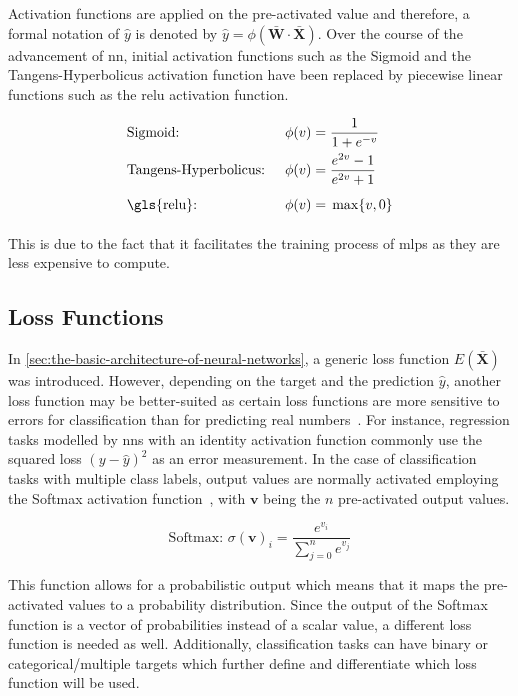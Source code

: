 \documentclass[draft,final]{vutinfth} %
\newcommand{\p}[1]{see p. #1}
\begin{document}
    \footnotetext{\cite[\p{13}]{aggarwal_neural_2018}}

    Activation functions are applied on the pre-activated value and therefore, a formal notation of $\hat{y}$ is denoted by $\hat{y}=\phi(\bar{\boldsymbol{W}}\cdot\bar{\boldsymbol{X}})$.
    Over the course of the advancement of \gls{nn}, initial activation functions such as the Sigmoid and the Tangens-Hyperbolicus activation function have been replaced by piecewise linear functions such as the \gls{relu} activation function.

    \begin{align*}
        &\text{Sigmoid: } &  \phi(v) & = \frac{1}{1+e^{-v}} \\
        &\text{Tangens-Hyperbolicus: } &  \phi(v) &= \frac{e^{2v}-1}{e^{2v}+1} \\
        &\text{\gls{relu}: } &  \phi(v)& = \vphantom{\frac11} \max\{v,0\}
    \end{align*}

    This is due to the fact that it facilitates the training process of \glspl{mlp} as they are less expensive to compute.

    \subsection{Loss Functions}\label{subsec:loss-functions}
    In \autoref{sec:the-basic-architecture-of-neural-networks}, a generic loss function $E(\bar{\boldsymbol{X}})$ was introduced.
    However, depending on the target and the prediction $\hat{y}$, another loss function may be better-suited as certain loss functions are more sensitive to errors for classification than for predicting real numbers~\citep[\p{15}]{aggarwal_neural_2018}.
    For instance, regression tasks modelled by \glspl{nn} with an identity activation function commonly use the squared loss $(y - \hat{y})^2$ as an error measurement.
    In the case of classification tasks with multiple class labels, output values are normally activated employing the Softmax activation function~\citep[\p{78}]{goodfellow_deep_2016}, with $\boldsymbol{v}$ being the $n$ pre-activated output values.

    \[
        \text{Softmax: } \sigma(\boldsymbol{v})_i = \frac{e^{v_i}}{\sum_{j=0}^{n}e^{v_j}}
    \]

    This function allows for a probabilistic output which means that it maps the pre-activated values to a probability distribution.
    Since the output of the Softmax function is a vector of probabilities instead of a scalar value, a different loss function is needed as well.
    Additionally, classification tasks can have binary or categorical/multiple targets which further define and differentiate which loss function will be used.
\end{document}

